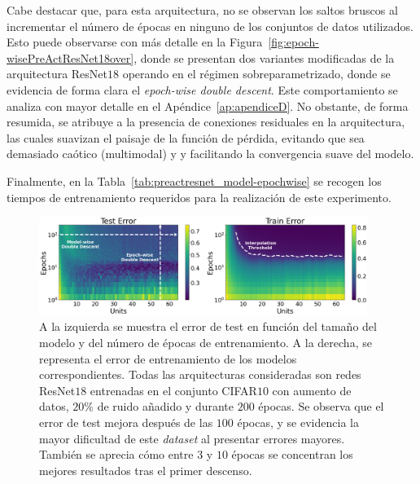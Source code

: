 Cabe destacar que, para esta arquitectura, no se observan los saltos bruscos al incrementar el número de épocas en ninguno de los conjuntos de datos utilizados. Esto puede observarse con más detalle en la Figura~\ref{fig:epoch-wisePreActResNet18over}, donde se presentan dos variantes modificadas de la arquitectura ResNet$18$ operando en el régimen sobreparametrizado, donde se evidencia de forma clara el \textit{epoch-wise double descent}. Este comportamiento se analiza con mayor detalle en el Apéndice~\ref{ap:apendiceD}. No obstante, de forma resumida, se atribuye a la presencia de conexiones residuales en la arquitectura, las cuales suavizan el paisaje de la función de pérdida, evitando que sea demasiado caótico (multimodal) y y facilitando la convergencia suave del modelo.

Finalmente, en la Tabla~\ref{tab:preactresnet_model-epochwise} se recogen los tiempos de entrenamiento requeridos para la realización de este experimento.

\begin{figure}[h]
    \centering
    \includegraphics[width=0.95\textwidth]{img/experiments/model-epochPreActResNet18CIFAR10augmented.png}
    \caption[Doble descenso en función del tamaño del modelo y del número de épocas para la red ResNet$18$ y el conjunto CIFAR$10$.]{A la izquierda se muestra el error de test en función del tamaño del modelo y del número de épocas de entrenamiento. A la derecha, se representa el error de entrenamiento de los modelos correspondientes. Todas las arquitecturas consideradas son redes ResNet$18$ entrenadas en el conjunto CIFAR$10$ con aumento de datos\protect\footnotemark, $20\%$ de ruido añadido y durante $200$ épocas. Se observa que el error de test mejora después de las $100$ épocas, y se evidencia la mayor dificultad de este \textit{dataset} al presentar errores mayores. También se aprecia cómo entre $3$ y $10$ épocas se concentran los mejores resultados tras el primer descenso.}\label{fig:model-epochPreActResNet18CIFAR10}
\end{figure}

